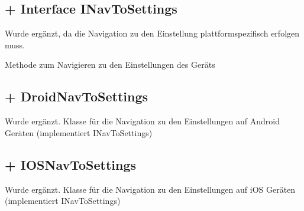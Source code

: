 \documentclass[../implementierung.tex]{subfiles}
\begin{document}
\subsection{+ Interface INavToSettings}
Wurde ergänzt, da die Navigation zu den Einstellung plattformspezifisch erfolgen muss.
\begin{itemize}
 Methode zum Navigieren zu den Einstellungen des Geräts
\end{itemize}
\subsection{+ DroidNavToSettings}
Wurde ergänzt. Klasse für die Navigation zu den Einstellungen auf Android Geräten (implementiert INavToSettings)
\subsection{+ IOSNavToSettings}
Wurde ergänzt. Klasse für die Navigation zu den Einstellungen auf iOS Geräten (implementiert INavToSettings)
\end{document}
